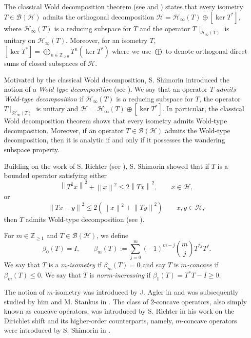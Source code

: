 \documentclass[11pt, reqno, a4paper]{amsart}
\theoremstyle{definition}
\newcommand{\calB}{{\mathcal{B}}}
\newcommand{\calH}{{\mathcal{H}}}
\newcommand{\norm}[1]{\left\lVert #1 \right\rVert}
\renewcommand{\le}{\leqslant}
\renewcommand{\ge}{\geqslant}
\newcommand{\Z}{\mathbb Z}
\numberwithin{equation}{section}
\begin{document}
    The classical Wold decomposition theorem (see \cite[Theorem 1.1]{MR2760647} and \cite[\S 1.3]{MR822228}) states that every isometry
    $T \in \calB(\calH)$ admits the orthogonal decomposition $\calH = \calH_{\infty} (T) \oplus [\ker T^{*}]$, where $\calH_{\infty} (T)$ is a reducing subspace for $T$ and the operator $T\mid_{\calH_{\infty} (T)}$ is unitary on $\calH_{\infty} (T)$. Moreover, for an isometry $T$, $[\ker T^*] = \bigoplus_{n \in \Z_{\ge 0}} T^n (\ker T^{*})$ where we use $\bigoplus$ to denote orthogonal direct sums of closed subspaces of $\calH$.
    
    Motivated by the classical Wold decomposition, S. Shimorin introduced the notion of a \textit{Wold-type decomposition} (see \cite[Definition 1.1]{zbMATH01572594}). We say that an operator $T$ \textit{admits Wold-type decomposition} if $\calH_{\infty} (T)$ is a reducing subspace for $T$, the  operator $T\mid_{\calH_{\infty} (T)}$ is unitary and $\calH = \calH_{\infty} (T) \oplus [\ker T^{*}]$. In particular, the classical Wold decomposition theorem shows that every isometry admits Wold-type decomposition. Moreover, if an operator $T \in \calB (\calH)$ admits the Wold-type decomposition, then it is analytic if and only if it possesses the wandering subspace property.
    
    Building on the work of S. Richter (see \cite[Theorem 1]{MR936999}), S. Shimorin showed that if $T$ is a bounded operator satisfying either 
    \begin{equation*}
        \norm{T^{2}x}^{2} + \norm{x}^{2} \le 2 \norm{Tx}^{2}, \qquad x \in \calH,
    \end{equation*}
    or 
    \begin{equation*}
        \norm{Tx + y}^{2} \le 2 (\norm{x}^2 + \norm{Ty}^2)\qquad x,y \in \calH, 
    \end{equation*}
    then $T$ admits Wold-type decomposition (see \cite[Theorem 3.6]{zbMATH01572594}). 
    
    For $m \in \Z_{\ge 1}$ and $T\in \calB (\calH)$, we define
    \begin{equation}
        \label{eq:beta-m}
        \beta_{0} (T) = I, \qquad\beta_m (T) := \sum_{j=0}^{m} (-1)^{m-j} \binom{m}{j} T^{*j} T^j.
    \end{equation}
    We say that $T$ is a \textit{$m$-isometry} if $\beta_m (T) = 0$ and say $T$ is \textit{$m$-concave} if $\beta_m (T) \le 0$. We say that $T$ is \textit{norm-increasing} if $\beta_1(T)=T^*T-I\ge 0$. 
    
    The notion of $m$-isometry was introduced by J. Agler in \cite{MR1037599} and was subsequently studied by him and M. Stankus in \cite{Agler1995, MR1346617, MR1382018}. The class of $2$-concave operators, also simply known as concave operators, was introduced by S. Richter in his work on the Dirichlet shift \cite{MR936999, MR1013337} and its higher-order counterparts, namely, $m$-concave operators were introduced by S. Shimorin in \cite{zbMATH01572594}.
    
\end{document}
